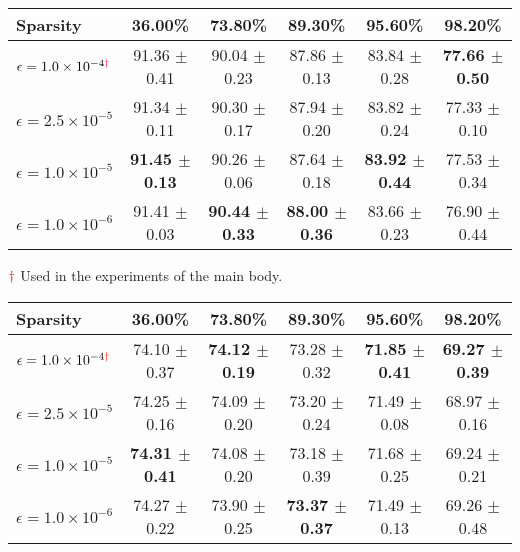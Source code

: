 \begin{table*}
    
    \begin{center}
    \caption{Ablation study of perturbation hyper-parameter $\epsilon$ on CIFAR-10 (ResNet-20). Best results are in \textbf{bold}.}     \label{tab:appendix-ablation-perturb-cifar10}
    \resizebox{1\linewidth}{!}
    {
    \begin{tabular}{l ccccc}
    \\
    \hline
    \toprule
    Sparsity & 36.00\% & 73.80\% & 89.30\% & 95.60\% & 98.20\% \\
    \midrule
    $\epsilon = 1.0 \times 10^{-4 \color{red}{\dagger}}$  & 91.36 $\pm$ 0.41 & 90.04 $\pm$ 0.23 & 87.86 $\pm$ 0.13 & 83.84 $\pm$ 0.28 & \textbf{77.66 $\pm$ 0.50}  \\
    $\epsilon = 2.5 \times 10^{-5}$ & 91.34 $\pm$ 0.11 & 90.30 $\pm$ 0.17 & 87.94 $\pm$ 0.20 & 83.82 $\pm$ 0.24 & 77.33 $\pm$ 0.10 \\
    $\epsilon = 1.0 \times 10^{-5}$ & \textbf{91.45 $\pm$ 0.13} & 90.26 $\pm$ 0.06 & 87.64 $\pm$ 0.18 & \textbf{83.92 $\pm$ 0.44} & 77.53 $\pm$ 0.34  \\
    $\epsilon = 1.0 \times 10^{-6}$ & 91.41 $\pm$ 0.03 & \textbf{90.44 $\pm$ 0.33} & \textbf{88.00 $\pm$ 0.36} & 83.66 $\pm$ 0.23 & 76.90 $\pm$ 0.44 \\

    \bottomrule
    \end{tabular}
    
    }
    
    \end{center}
    \footnotesize{$\color{red}{\dagger}$ Used in the experiments of the main body.}
        \begin{center}
    \caption{Ablation study of perturbation hyper-parameter $\epsilon$ on CIFAR-100 (VGG-16). Best results are in \textbf{bold}.}     \label{tab:appendix-ablation-perturb-cifar100}
    \resizebox{1\linewidth}{!}
    {
    \begin{tabular}{l ccccc}
    \\
    \hline
    \toprule
    Sparsity & 36.00\% & 73.80\% & 89.30\% & 95.60\% & 98.20\% \\
    \midrule
    $\epsilon = 1.0 \times 10^{-4 \color{red}{\dagger}}$  & 74.10 $\pm$ 0.37 & \textbf{74.12 $\pm$ 0.19} & 73.28 $\pm$ 0.32 & \textbf{71.85 $\pm$ 0.41} & \textbf{69.27 $\pm$ 0.39}  \\
    $\epsilon = 2.5 \times 10^{-5}$ & 74.25 $\pm$ 0.16 & 74.09 $\pm$ 0.20 & 73.20 $\pm$ 0.24 & 71.49 $\pm$ 0.08 & 68.97 $\pm$ 0.16 \\
    $\epsilon = 1.0 \times 10^{-5}$ & \textbf{74.31 $\pm$ 0.41} & 74.08 $\pm$ 0.20 & 73.18 $\pm$ 0.39 & 71.68 $\pm$ 0.25 & 69.24 $\pm$ 0.21  \\
    $\epsilon = 1.0 \times 10^{-6}$ & 74.27 $\pm$ 0.22 & 73.90 $\pm$ 0.25 & \textbf{73.37 $\pm$ 0.37} & 71.49 $\pm$ 0.13 & 69.26 $\pm$ 0.48 \\


\end{tabular}}
\end{center}
\end{table*}
